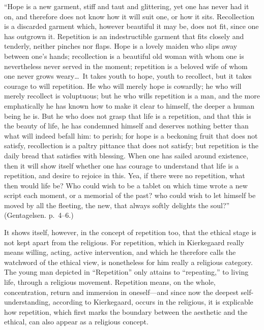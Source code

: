 \documentclass[12pt,a4paper]{book}
\newcommand{\opage}[1]{\marginnote{\footnotesize\textit{[#1]}}}
\begin{document}
``Hope is a new garment, stiff and taut and glittering, yet one has never
had it on, and therefore does not know how it will suit one, or how it
sits. Recollection is a discarded garment which, however beautiful it may
be, does not fit, since one has outgrown it. Repetition is an
indestructible garment that fits closely and tenderly, neither pinches nor
flaps. Hope is a lovely maiden who slips away between one's hands;
recollection is a beautiful old woman with whom one is nevertheless never
served in the moment; repetition is a beloved wife of whom one never grows
weary\dots\ It takes
\opage{97}youth to hope, youth to recollect, but it takes courage to will
repetition. He who will merely hope is cowardly; he who will merely
recollect is voluptuous; but he who wills repetition is a man, and the more
emphatically he has known how to make it clear to himself, the deeper a
human being he is. But he who does not grasp that life is a repetition,
and that this is the beauty of life, he has condemned himself and deserves
nothing better than what will indeed befall him: to perish; for hope is a
beckoning fruit that does not satisfy, recollection is a paltry pittance
that does not satisfy; but repetition is the daily bread that satisfies
with blessing. When one has sailed around existence, then it will show
itself whether one has courage to understand that life is a repetition,
and desire to rejoice in this. Yea, if there were no repetition, what then
would life be? Who could wish to be a tablet on which time wrote a new
script each moment, or a memorial of the past? who could wish to let
himself be moved by all the fleeting, the new, that always softly delights
the soul?''
(Gentagelsen. p.~4--6.)

It shows itself, however, in the concept of repetition too, that the
ethical stage is not kept apart from the religious. For repetition, which
in Kierkegaard really means willing, acting, active intervention, and which
he therefore calls the watchword of the ethical view, is nonetheless for
him really a religious category. The young man depicted in ``Repetition''
only attains to ``repeating,'' to living life, through a religious
movement. Repetition means, on the whole, concentration, return and
immersion in oneself---and since now the deepest self-understanding,
according to Kierkegaard, occurs in the religious, it is explicable how
repetition, which first marks the boundary between
\opage{98}the aesthetic and the ethical, can also appear as a religious
concept.
\end{document}
